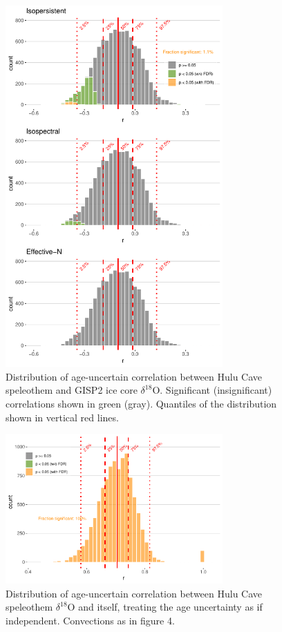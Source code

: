 \documentclass[gchron, manuscript]{copernicus}
\begin{document}
\begin{figure}
\includegraphics[width=8.3cm]{geoChronR-paper_files/figure-latex/cor-hist-1} \caption{Distribution of age-uncertain correlation between Hulu Cave speleothem and GISP2 ice core $\delta^{18}$O. Significant (insignificant) correlations shown in green (gray).  Quantiles of the distribution shown in vertical red lines.}\label{fig:cor-hist}
\end{figure}

\begin{figure}
\includegraphics[width=8.3cm]{geoChronR-paper_files/figure-latex/hulu-cor-hist-1} \caption{Distribution of age-uncertain correlation between Hulu Cave speleothem $\delta^{18}$O and itself, treating the age uncertainty as if independent. Convections as in figure 4.}\label{fig:hulu-cor-hist}
\end{figure}
\end{document}
